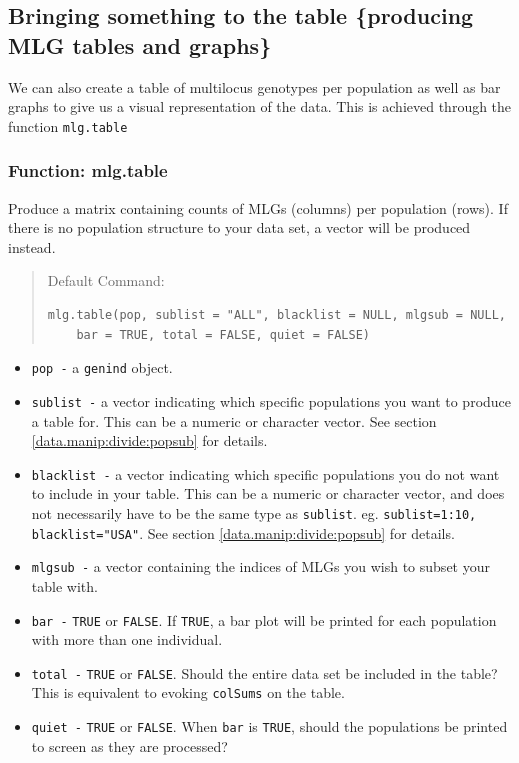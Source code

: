 \documentclass[letterpaper]{article}\usepackage[]{graphicx}\usepackage[]{color}
\makeatletter
\newenvironment{kframe}{%
 \def\at@end@of@kframe{}%
 \ifinner\ifhmode%
  \def\at@end@of@kframe{\end{minipage}}%
  \begin{minipage}{\columnwidth}%
 \fi\fi%
 \def\FrameCommand##1{\hskip\@totalleftmargin \hskip-\fboxsep
 \colorbox{shadecolor}{##1}\hskip-\fboxsep
     \hskip-\linewidth \hskip-\@totalleftmargin \hskip\columnwidth}%
 \MakeFramed {\advance\hsize-\width
   \@totalleftmargin\z@ \linewidth\hsize
   \@setminipage}}%
 {\par\unskip\endMakeFramed%
 \at@end@of@kframe}
\newenvironment{knitrout}{}{} %
\newcommand{\tab}{\hspace*{1em}}
\makeatother
\begin{document}
\subsection{Bringing something to the table \{producing MLG tables and graphs\}}\label{mlg:table}

We can also create a table of multilocus genotypes per population as well as bar graphs to give us a visual representation of the data. This is achieved through the function \texttt{mlg.table}
\subsubsection{Function: mlg.table}\label{mlg:table:mlg.table}

\tab\tab Produce a matrix containing counts of MLGs (columns) per population (rows). If there is no population structure to your data set, a vector will be produced instead.
\begin{quote}
Default Command:
\begin{knitrout}
\color{fgcolor}\begin{kframe}
\begin{verbatim}
mlg.table(pop, sublist = "ALL", blacklist = NULL, mlgsub = NULL, 
    bar = TRUE, total = FALSE, quiet = FALSE)
\end{verbatim}
\end{kframe}
\end{knitrout}

\end{quote}
  \begin{itemize}
    \item \texttt{pop -} a \texttt{genind} object.
    \item \texttt{sublist -} a vector indicating which specific populations you want to produce a table for. This can be a numeric or character vector. See section \ref{data.manip:divide:popsub} for details.
    \item \texttt{blacklist -} a vector indicating which specific populations you do not want to include in your table. This can be a numeric or character vector, and does not necessarily have to be the same type as \texttt{sublist}. eg. \texttt{sublist=1:10, blacklist="USA"}. See section \ref{data.manip:divide:popsub} for details.
    \item \texttt{mlgsub -} a vector containing the indices of MLGs you wish to subset your table with. 
    \item \texttt{bar -} \texttt{TRUE} or \texttt{FALSE}. If  \texttt{TRUE}, a bar plot will be printed for each population with more than one individual. 
    \item \texttt{total -} \texttt{TRUE} or \texttt{FALSE}. Should the entire data set be included in the table? This is equivalent to evoking \texttt{colSums} on the table.
    \item \texttt{quiet -} \texttt{TRUE} or \texttt{FALSE}. When \texttt{bar} is \texttt{TRUE}, should the populations be printed to screen as they are processed?
  \end{itemize}
\end{document}
